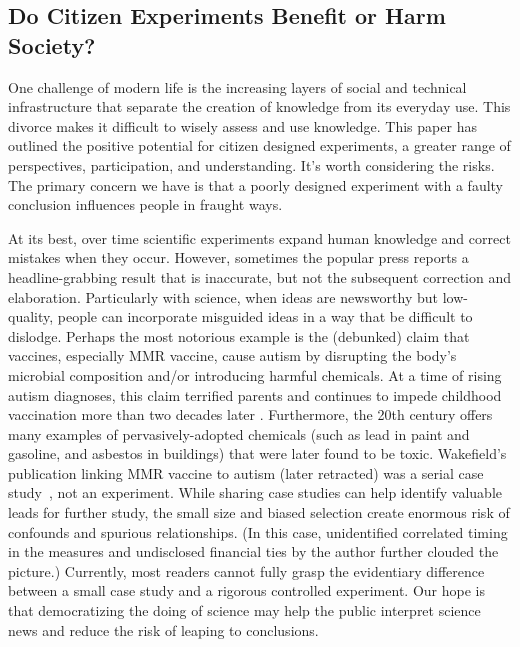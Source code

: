 \subsection{Do Citizen  Experiments Benefit or Harm Society?}
One challenge of modern life is the increasing layers of social and technical infrastructure that separate the creation of knowledge from its everyday use. This divorce makes it difficult to wisely assess and use knowledge. This paper has outlined the positive potential for citizen designed experiments, a greater range of perspectives, participation, and understanding. It's worth considering the risks. The primary concern we have is that a poorly designed experiment with a faulty conclusion influences people in fraught ways.
 
At its best, over time scientific experiments expand human knowledge and correct mistakes when they occur. However, sometimes the popular press reports a headline-grabbing result that is inaccurate, but not the subsequent correction and elaboration. Particularly with science, when ideas are newsworthy but low-quality, people can incorporate misguided ideas in a way that be difficult to dislodge. Perhaps the most notorious example is the (debunked) claim that vaccines, especially MMR vaccine, cause autism by disrupting the body's microbial composition  and/or introducing harmful chemicals. At a time of rising autism diagnoses, this claim terrified parents and continues to impede childhood vaccination more than two decades later . Furthermore, the 20th century offers many examples of pervasively-adopted chemicals (such as lead in paint and gasoline, and asbestos in buildings) that were later found to be toxic. Wakefield's publication linking MMR vaccine to autism (later retracted) was a serial case study~\cite{Godleec7452}, not an experiment. While sharing case studies can help identify valuable leads for further study, the small size and biased selection create enormous risk of confounds and spurious relationships. (In this case, unidentified correlated timing in the measures and undisclosed financial ties by the author further clouded the picture.) Currently, most readers cannot fully grasp the evidentiary difference between a small case study and a rigorous controlled experiment. Our hope is that democratizing the doing of science may help the public interpret science news and reduce the risk of leaping to conclusions.

